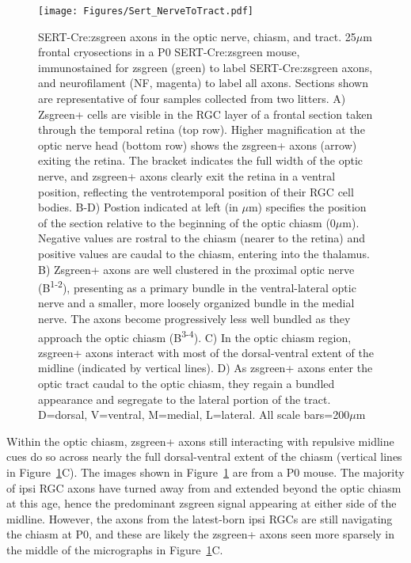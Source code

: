 \begin{figure}[hbtp]
	\begin{center}
		\texttt{[image: Figures/Sert\_NerveToTract.pdf]}
		\caption[SERT-Cre:zsgreen axons in the optic nerve, chiasm, and tract.]
		{SERT-Cre:zsgreen axons in the optic nerve, chiasm, and tract. 
		25$\mu$m frontal cryosections in a P0 SERT-Cre:zsgreen mouse, immunostained for zsgreen (green) to label SERT-Cre:zsgreen axons, and neurofilament (NF, magenta) to label all axons.
		Sections shown are representative of four samples collected from two litters. %
		A) Zsgreen+ cells are visible in the RGC layer of a frontal section taken through the temporal retina (top row).
		Higher magnification at the optic nerve head (bottom row) shows the zsgreen+ axons (arrow) exiting the retina.
		The bracket indicates the full width of the optic nerve, and zsgreen+ axons clearly exit the retina in a ventral position, reflecting the ventrotemporal position of their RGC cell bodies.
		B-D) Postion indicated at left (in $\mu$m) specifies the position of the section relative to the beginning of the optic chiasm (0$\mu$m).
		Negative values are rostral to the chiasm (nearer to the retina) and positive values are caudal to the chiasm, entering into the thalamus.
		B) Zsgreen+ axons are well clustered in the proximal optic nerve (B\textsuperscript{1-2}), presenting as a primary bundle in the ventral-lateral optic nerve and a smaller, more loosely organized bundle in the medial nerve. 
		The axons become progressively less well bundled as they approach the optic chiasm (B\textsuperscript{3-4}). 
		C) In the optic chiasm region, zsgreen+ axons interact with most of the dorsal-ventral extent of the midline (indicated by vertical lines).
		D) As zsgreen+ axons enter the optic tract caudal to the optic chiasm, they regain a bundled appearance and segregate to the lateral portion of the tract.
		D=dorsal, V=ventral, M=medial, L=lateral. 
		All scale bars=200$\mu$m}
		\label{Figures/Sert_NerveToTract}
	\end{center}
\end{figure}

Within the optic chiasm, zsgreen+ axons still interacting with repulsive midline cues do so across nearly the full dorsal-ventral extent of the chiasm (vertical lines in Figure~\ref{Figures/Sert_NerveToTract}C).
The images shown in Figure~\ref{Figures/Sert_NerveToTract} are from a P0 mouse.
The majority of ipsi RGC axons have turned away from and extended beyond the optic chiasm at this age, hence the predominant zsgreen signal appearing at either side of the midline.
However, the axons from the latest-born ipsi RGCs are still navigating the chiasm at P0, and these are likely the zsgreen+ axons seen more sparsely in the middle of the micrographs in Figure~\ref{Figures/Sert_NerveToTract}C.

